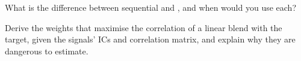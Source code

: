\begin{interviewq}\label{iq:rs:signal-combination:5}
What is the difference between sequential and , and when would you use each?
\end{interviewq}

\begin{interviewq}\label{iq:rs:signal-combination:6}
Derive the weights that maximise the correlation of a linear blend with the target, given the signals' ICs and correlation matrix, and explain
why they are dangerous to estimate.
\end{interviewq}
